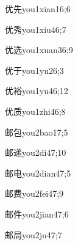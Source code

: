 \begin{verbete}{优先}{you1xian1}{6;6}
\end{verbete}

\begin{verbete}{优秀}{you1xiu4}{6;7}
\end{verbete}

\begin{verbete}{优选}{you1xuan3}{6;9}
\end{verbete}

\begin{verbete}{优于}{you1yu2}{6;3}
\end{verbete}

\begin{verbete}{优裕}{you1yu4}{6;12}
\end{verbete}

\begin{verbete}{优质}{you1zhi4}{6;8}
\end{verbete}

\begin{verbete}{邮包}{you2bao1}{7;5}
\end{verbete}

\begin{verbete}{邮递}{you2di4}{7;10}
\end{verbete}

\begin{verbete}{邮电}{you2dian4}{7;5}
\end{verbete}

\begin{verbete}{邮费}{you2fei4}{7;9}
\end{verbete}

\begin{verbete}{邮件}{you2jian4}{7;6}
\end{verbete}

\begin{verbete}{邮局}{you2ju4}{7;7}
\end{verbete}

